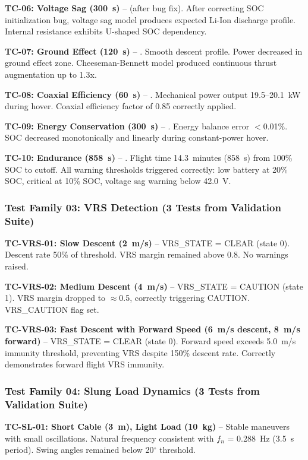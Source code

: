 \documentclass[11pt, letterpaper]{article}
\begin{document}
\unclass \textbf{TC-06: Voltage Sag (300~s)} -- \PASS (after bug fix). After correcting SOC initialization bug, voltage sag model produces expected Li-Ion discharge profile. Internal resistance exhibits U-shaped SOC dependency.

\unclass \textbf{TC-07: Ground Effect (120~s)} -- \PASS. Smooth descent profile. Power decreased in ground effect zone. Cheeseman-Bennett model produced continuous thrust augmentation up to 1.3x.

\unclass \textbf{TC-08: Coaxial Efficiency (60~s)} -- \PASS. Mechanical power output 19.5--20.1~kW during hover. Coaxial efficiency factor of 0.85 correctly applied.

\unclass \textbf{TC-09: Energy Conservation (300~s)} -- \PASS. Energy balance error $<$0.01\%. SOC decreased monotonically and linearly during constant-power hover.

\unclass \textbf{TC-10: Endurance (858~s)} -- \PASS. Flight time 14.3~minutes (858~s) from 100\% SOC to cutoff. All warning thresholds triggered correctly: low battery at 20\% SOC, critical at 10\% SOC, voltage sag warning below 42.0~V.

\subsubsection{\unclass Test Family 03: VRS Detection (3 Tests from Validation Suite)}

\unclass \textbf{TC-VRS-01: Slow Descent (2~m/s)} -- VRS\_STATE = CLEAR (state 0). Descent rate 50\% of threshold. VRS margin remained above 0.8. No warnings raised.

\unclass \textbf{TC-VRS-02: Medium Descent (4~m/s)} -- VRS\_STATE = CAUTION (state 1). VRS margin dropped to $\approx$0.5, correctly triggering CAUTION. VRS\_CAUTION flag set.

\unclass \textbf{TC-VRS-03: Fast Descent with Forward Speed (6~m/s descent, 8~m/s forward)} -- VRS\_STATE = CLEAR (state 0). Forward speed exceeds 5.0~m/s immunity threshold, preventing VRS despite 150\% descent rate. Correctly demonstrates forward flight VRS immunity.

\subsubsection{\unclass Test Family 04: Slung Load Dynamics (3 Tests from Validation Suite)}

\unclass \textbf{TC-SL-01: Short Cable (3~m), Light Load (10~kg)} -- Stable maneuvers with small oscillations. Natural frequency consistent with $f_n$ = 0.288~Hz (3.5~s period). Swing angles remained below 20$^\circ$ threshold.
\end{document}
